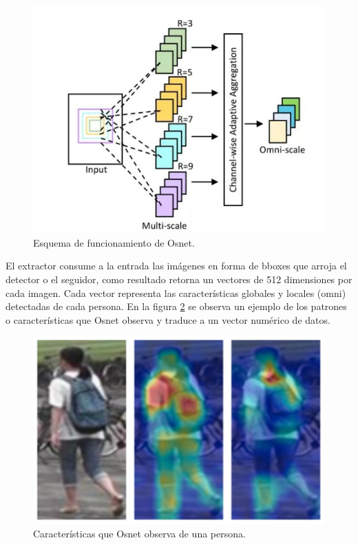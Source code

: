 \begin{figure}[ht]
	\centering
	\includegraphics[scale=.60]{./Figures/osnet.jpg}
	\caption{Esquema de funcionamiento de Osnet\protect\footnotemark.}
	\label{fig:osnet}
\end{figure}


El extractor consume a la entrada las imágenes en forma de bboxes que arroja el detector o el seguidor, como resultado retorna un vectores de 512 dimensiones por cada imagen. Cada vector representa las características globales y locales (omni) detectadas de cada persona. En la figura \ref{fig:osnetFeatureMap} se observa un ejemplo de los patrones o características que Osnet observa y traduce a un vector numérico de datos.

\begin{figure}[ht]
	\centering
	\includegraphics[scale=.60]{./Figures/osnetFeatureMap.png}
	\caption{Características que Osnet observa de una persona\protect\footnotemark.}
	\label{fig:osnetFeatureMap}
\end{figure}

